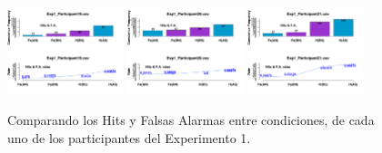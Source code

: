 \begin{figure}[th]
\includegraphics[width=0.30\textwidth]{Figures/MirrorRate_Exp1_P19} \includegraphics[width=0.30\textwidth]{Figures/MirrorRate_Exp1_P20} \includegraphics[width=0.30\textwidth]{Figures/MirrorRate_Exp1_P21} 
\caption[Rate_Exp1]{Comparando los Hits y Falsas Alarmas entre condiciones, de cada uno de los participantes del Experimento 1.}
\label{fig:Rate_E1}
\end{figure}

